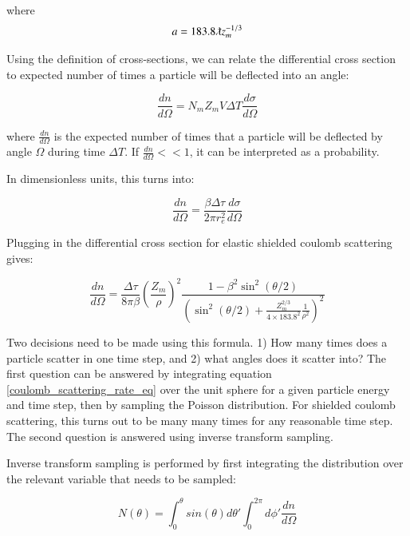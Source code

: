 \documentclass[]{article}
\begin{document}
where
\begin{equation} 
a=183.8 \lambdabar z_m^{-1/3}
\end{equation}

Using the definition of cross-sections, we can relate the differential cross section to expected number of times a particle will be deflected into an angle:

\begin{equation} 
\frac{dn}{d \Omega} =N_m Z_m V \Delta T \frac{d \sigma}{d \Omega}
\end{equation}

where $\frac{dn}{d \Omega}$ is the expected number of times that a particle will be deflected by angle $\Omega$ during time $\Delta T$. If $\frac{dn}{d \Omega} << 1$, it can be interpreted as a probability. 

In dimensionless units, this turns into:

\begin{equation} 
\label{dimensionless_cross_section_eq}
\frac{dn}{d \Omega} =\frac{ \beta \Delta \tau }{2 \pi r_e^2} \frac{d \sigma}{d \Omega}
\end{equation}

Plugging in the differential cross section for elastic shielded coulomb scattering gives:

\begin{equation}
\label{coulomb_scattering_rate_eq}
\frac{dn}{d \Omega} =\frac{ \Delta \tau }{8 \pi \beta }\left( \frac{Z_m}{\rho} \right)^2  \frac{1-\beta^2\sin^2(\theta/2)}{ \left(  \sin^2(\theta/2) + \frac{Z_m^{2/3}}{4\times 183.8^2} \frac{1}{\rho^2} \right)^2 }
\end{equation}

Two decisions need to be made using this formula. 1) How many times does a particle scatter in one time step, and 2) what angles does it scatter into? The first question can be answered by integrating equation \ref{coulomb_scattering_rate_eq} over the unit sphere for a given particle energy and time step, then by sampling the Poisson distribution. For shielded coulomb scattering, this turns out to be many many times for any reasonable time step. The second question is answered using inverse transform sampling. 

Inverse transform sampling is performed by first integrating the distribution over the relevant variable that needs to be sampled:

\begin{equation}
N(\theta) = \int_0^{\theta} sin(\theta ) d\theta '  \int_0^{2\pi} d\phi ' \frac{dn}{d\Omega}
\end{equation}
\end{document}
